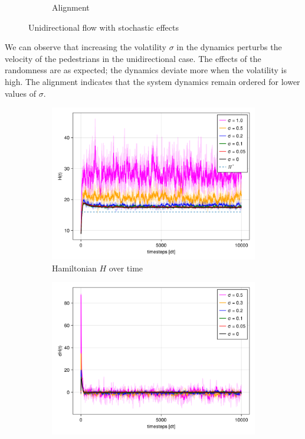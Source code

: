 \begin{itemize}
\begin{figure}[H]
\begin{subfigure}{.49\textwidth}
            \caption{Alignment}
            \label{plot:stoc_uni_alignment}
        \end{subfigure}
        \caption{Unidirectional flow with stochastic effects}
        \label{plot:stoc_uni}
    \end{figure}
    We can observe that increasing the volatility $\sigma$ in the dynamics perturbs the velocity of the pedestrians in the unidirectional case. The effects of the randomness are as expected; the dynamics deviate more when the volatility is high. The alignment indicates that the system dynamics remain ordered for lower values of $\sigma$.

    \begin{figure}[H]
        \centering
        \begin{subfigure}{.49\textwidth}
            \centering
            \includegraphics[width=\linewidth]{figures/ch5_collective_stoch/H_stochasic_uni.png}
            \caption{Hamiltonian $H$ over time}
            \label{plot:stoc_uni_h}
        \end{subfigure}
        \begin{subfigure}{.49\textwidth}
            \centering
            \includegraphics[width=\linewidth]{figures/ch5_collective_stoch/dH_stochasic_uni.png}

\end{subfigure}
\end{figure}
\end{itemize}
